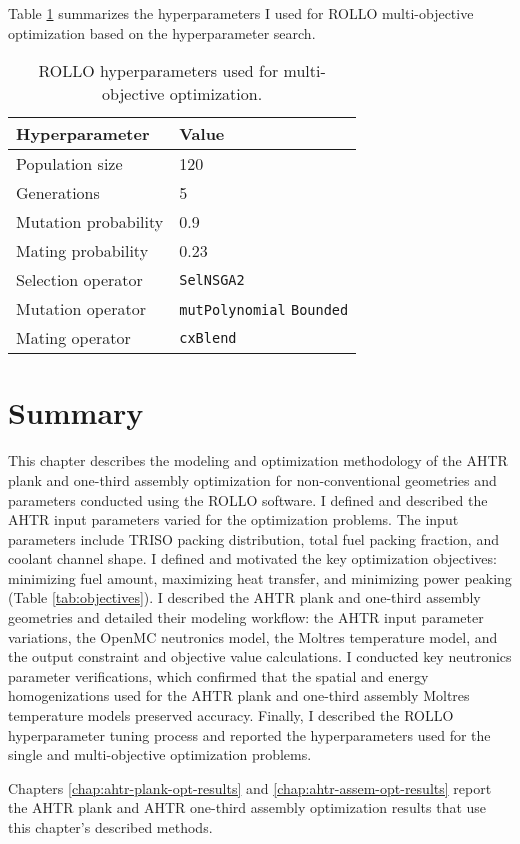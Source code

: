 Table \ref{tab:multi-obj-hyp} summarizes the hyperparameters I used for \gls{ROLLO} 
multi-objective optimization based on the hyperparameter search. 
\begin{table}[htbp]
    \centering
    \onehalfspacing
    \caption{\acrfull{ROLLO} hyperparameters used for multi-objective optimization.}
	\label{tab:multi-obj-hyp}
    \footnotesize
    \begin{tabular}{ll}
    \hline 
    \textbf{Hyperparameter} & \textbf{Value} \\
    \hline 
    Population size & 120 \\
    Generations & 5 \\
    Mutation probability & 0.9 \\
    Mating probability & 0.23 \\
    Selection operator & \texttt{SelNSGA2} \\
    Mutation operator & \texttt{mutPolynomial} \texttt{Bounded} \\
    Mating operator & \texttt{cxBlend} \\
    \hline
    \end{tabular}
\end{table}


\section{Summary}
\glsresetall
This chapter describes the modeling and optimization methodology of the 
\gls{AHTR} plank and one-third assembly optimization for non-conventional 
geometries and parameters conducted using the \gls{ROLLO} software.
I defined and described the \gls{AHTR} input parameters varied for the optimization 
problems. 
The input parameters include \gls{TRISO} packing distribution, total fuel packing 
fraction, and coolant channel shape. 
I defined and motivated the key optimization objectives: minimizing fuel amount,
maximizing heat transfer, and minimizing power peaking (Table \ref{tab:objectives}).
I described the \gls{AHTR} plank and one-third assembly geometries and  
detailed their modeling workflow: the \gls{AHTR} input parameter variations, 
the OpenMC neutronics model, the Moltres temperature model, and 
the output constraint and objective value calculations. 
I conducted key neutronics parameter verifications, which confirmed that the spatial 
and energy homogenizations used for the \gls{AHTR} plank and one-third assembly Moltres 
temperature models preserved accuracy.
Finally, I described the \gls{ROLLO} hyperparameter tuning process and reported the 
hyperparameters used for the single and multi-objective optimization problems. 

Chapters \ref{chap:ahtr-plank-opt-results} and \ref{chap:ahtr-assem-opt-results} 
report the \gls{AHTR} plank and \gls{AHTR} one-third assembly optimization results 
that use this chapter's described methods.